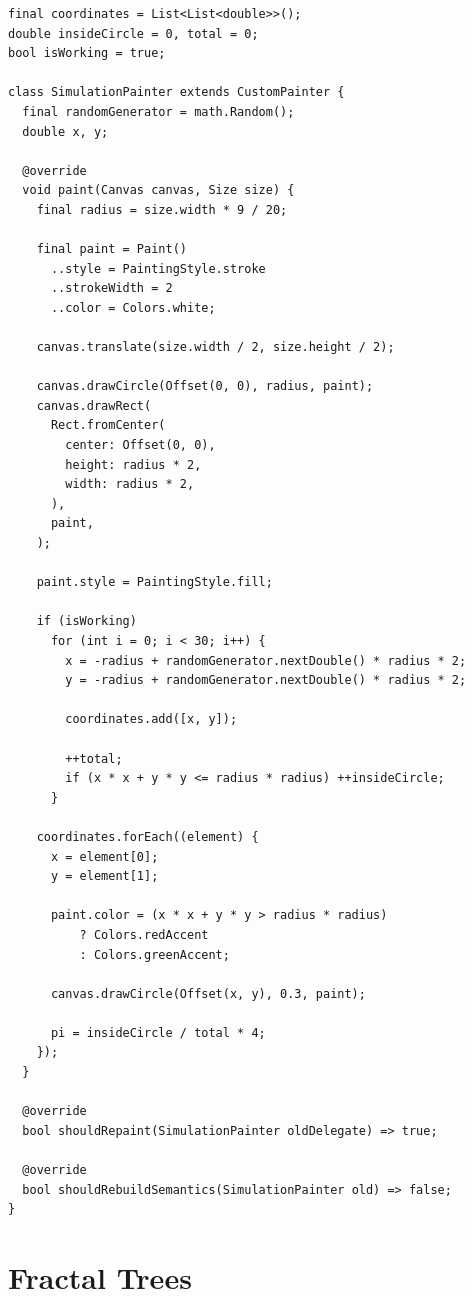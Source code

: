 \documentclass{resonance}
\begin{document}
\begin{verbatim}
final coordinates = List<List<double>>();
double insideCircle = 0, total = 0;
bool isWorking = true;

class SimulationPainter extends CustomPainter {
  final randomGenerator = math.Random();
  double x, y;

  @override
  void paint(Canvas canvas, Size size) {
    final radius = size.width * 9 / 20;

    final paint = Paint()
      ..style = PaintingStyle.stroke
      ..strokeWidth = 2
      ..color = Colors.white;

    canvas.translate(size.width / 2, size.height / 2);

    canvas.drawCircle(Offset(0, 0), radius, paint);
    canvas.drawRect(
      Rect.fromCenter(
        center: Offset(0, 0),
        height: radius * 2,
        width: radius * 2,
      ),
      paint,
    );

    paint.style = PaintingStyle.fill;

    if (isWorking)
      for (int i = 0; i < 30; i++) {
        x = -radius + randomGenerator.nextDouble() * radius * 2;
        y = -radius + randomGenerator.nextDouble() * radius * 2;

        coordinates.add([x, y]);

        ++total;
        if (x * x + y * y <= radius * radius) ++insideCircle;
      }

    coordinates.forEach((element) {
      x = element[0];
      y = element[1];

      paint.color = (x * x + y * y > radius * radius)
          ? Colors.redAccent
          : Colors.greenAccent;

      canvas.drawCircle(Offset(x, y), 0.3, paint);

      pi = insideCircle / total * 4;
    });
  }

  @override
  bool shouldRepaint(SimulationPainter oldDelegate) => true;

  @override
  bool shouldRebuildSemantics(SimulationPainter old) => false;
}
	\end{verbatim}
	\pagebreak
	\section{Fractal Trees}
	
\end{document}
